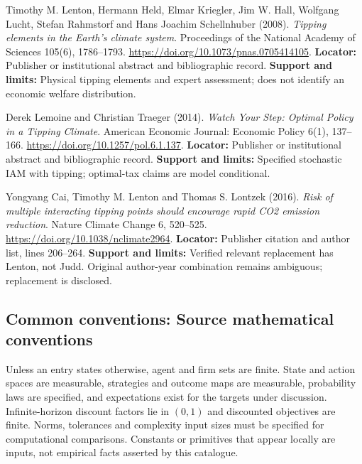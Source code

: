 \documentclass[11pt,a4paper]{article}
\begin{document}
\begin{enumerate}[label={[\textnormal{S}\arabic*]},leftmargin=*]

\item Timothy M. Lenton, Hermann Held, Elmar Kriegler, Jim W. Hall, Wolfgang Lucht, Stefan Rahmstorf and Hans Joachim Schellnhuber (2008). \emph{Tipping elements in the Earth’s climate system}. Proceedings of the National Academy of Sciences 105(6), 1786–1793. \url{https://doi.org/10.1073/pnas.0705414105}. \textbf{Locator:} Publisher or institutional abstract and bibliographic record. \textbf{Support and limits:} Physical tipping elements and expert assessment; does not identify an economic welfare distribution.

\item Derek Lemoine and Christian Traeger (2014). \emph{Watch Your Step: Optimal Policy in a Tipping Climate}. American Economic Journal: Economic Policy 6(1), 137–166. \url{https://doi.org/10.1257/pol.6.1.137}. \textbf{Locator:} Publisher or institutional abstract and bibliographic record. \textbf{Support and limits:} Specified stochastic IAM with tipping; optimal-tax claims are model conditional.

\item Yongyang Cai, Timothy M. Lenton and Thomas S. Lontzek (2016). \emph{Risk of multiple interacting tipping points should encourage rapid CO2 emission reduction}. Nature Climate Change 6, 520–525. \url{https://doi.org/10.1038/nclimate2964}. \textbf{Locator:} Publisher citation and author list, lines 206–264. \textbf{Support and limits:} Verified relevant replacement has Lenton, not Judd. Original author-year combination remains ambiguous; replacement is disclosed.

\end{enumerate}

\subsection*{Common conventions: Source mathematical conventions}

Unless an entry states otherwise, agent and firm sets are finite. State and action spaces are measurable, strategies and outcome maps are measurable, probability laws are specified, and expectations exist for the targets under discussion. Infinite-horizon discount factors lie in $(0,1)$ and discounted objectives are finite. Norms, tolerances and complexity input sizes must be specified for computational comparisons. Constants or primitives that appear locally are inputs, not empirical facts asserted by this catalogue.
\end{document}
